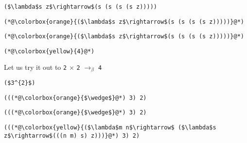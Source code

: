 \documentclass{beamer}
\begin{document}
\begin{frame}[fragile]{\CurrentSection}
\lstset{basicstyle=\ttfamily\small}\lstset{numbers=none}\lstset{language=ML}\begin{lstlisting}
($\lambda$s z$\rightarrow$(s (s (s (s z)))))
\end{lstlisting}
\pause\lstset{language=ML}\begin{lstlisting}
(*@\colorbox{orange}{($\lambda$s z$\rightarrow$(s (s (s (s z)))))}@*)
\end{lstlisting}

\end{frame}

\begin{frame}[fragile]{\CurrentSection}
\lstset{basicstyle=\ttfamily\small}\lstset{numbers=none}\lstset{language=ML}\begin{lstlisting}
(*@\colorbox{orange}{($\lambda$s z$\rightarrow$(s (s (s (s z)))))}@*)
\end{lstlisting}
\pause\lstset{language=ML}\begin{lstlisting}
(*@\colorbox{yellow}{4}@*)
\end{lstlisting}

\end{frame}

\begin{frame}[fragile]{\CurrentSection}
\begin{block}{\CurrentSubSection}
Let us try it out to \texttt{2} $\times$ \texttt{2} $\rightarrow_\beta$ \texttt{4}
\end{block}


\end{frame}

\begin{frame}[fragile]{\CurrentSection}
\lstset{basicstyle=\ttfamily\small}\lstset{numbers=none}\lstset{language=ML}\begin{lstlisting}
($3^{2}$)
\end{lstlisting}
\pause\lstset{language=ML}\begin{lstlisting}
(((*@\colorbox{orange}{$\wedge$}@*) 3) 2)
\end{lstlisting}

\end{frame}

\begin{frame}[fragile]{\CurrentSection}
\lstset{basicstyle=\ttfamily\small}\lstset{numbers=none}\lstset{language=ML}\begin{lstlisting}
(((*@\colorbox{orange}{$\wedge$}@*) 3) 2)
\end{lstlisting}
\pause\lstset{language=ML}\begin{lstlisting}
(((*@\colorbox{yellow}{($\lambda$m n$\rightarrow$ ($\lambda$s z$\rightarrow$(((n m) s) z)))}@*) 3) 2)
\end{lstlisting}

\end{frame}
\end{document}
